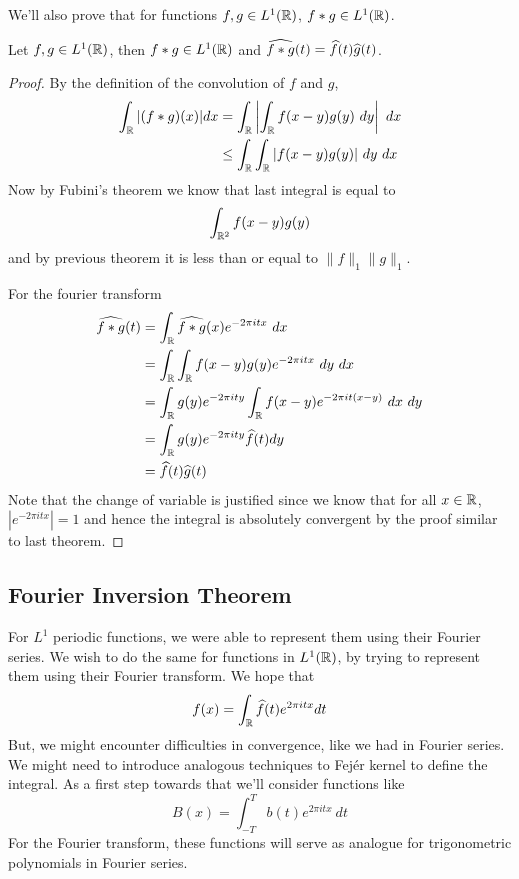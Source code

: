   We'll also prove that for functions $f, g \in L^1(\mathbb R)$, $f*g \in L^1(\mathbb R)$.
  \begin{proposition}
    \label{prop:convolution_is_well_defined_in_L^1(R)}
    Let $f, g \in L^1(\mathbb R)$, then $f*g \in L^1(\mathbb R)$ and $\widehat{f*g}(t) = \widehat{f}(t)\widehat{g}(t)$.
  \end{proposition}
  \begin{proof}
    By the definition of the convolution of $f$ and $g$, 
    \begin{align*}
      \int_\mathbb R|(f*g)(x)| dx &= \int_\mathbb R \left| \int_\mathbb R f(x-y)g(y) \ dy \right| \ dx \\
      & \le \int_\mathbb R \int_\mathbb R |f(x-y)g(y)| \ dy \ dx
    \end{align*}
    Now by Fubini's theorem we know that last integral is equal to $$\int_{\mathbb R^2}f(x-y)g(y) $$ and by previous theorem it is less than or equal to $\|f\|_1\|g\|_1$.

    For the fourier transform
    \begin{align*}
      \widehat{f*g}(t) &= \int_\R \widehat{f*g}(x) e^{-2 \pi itx} \ dx \\
      &= \int_\R \int_\R f(x-y)g(y) e^{-2 \pi itx} \ dy \ dx \\
      &= \int_\R g(y)e^{-2 \pi ity}\int_\R f(x-y) e^{-2 \pi it (x-y)} \ dx \ dy \\
      &= \int_\R g(y)e^{-2 \pi ity} \hatf(t) dy \\
      &= \hatf(t) \hatg(t) \\
    \end{align*}
    Note that the change of variable is justified since we know that  for all $x \in \mathbb R$, $|e^{-2\pi itx}| = 1$ and hence the integral is absolutely convergent by the proof similar to last theorem. 
  \end{proof}


\subsection{Fourier Inversion Theorem}
For $L^1$ periodic functions, we were able to represent them using their Fourier series. We wish to do the same for functions in $L^1(\mathbb R)$, by trying to represent them using their Fourier transform. We hope that $$f(x) = \int_\mathbb R \widehat{f}(t) e^{2\pi itx} dt$$
But, we might encounter difficulties in convergence, like we had in Fourier series. We might need to introduce analogous techniques to Fej\'er kernel to define the integral. As a first step towards that we'll consider functions like $$B(x) = \int_{-T}^T b(t)e^{2 \pi itx} \ dt$$
For the Fourier transform, these functions will serve as analogue for trigonometric polynomials in Fourier series.

